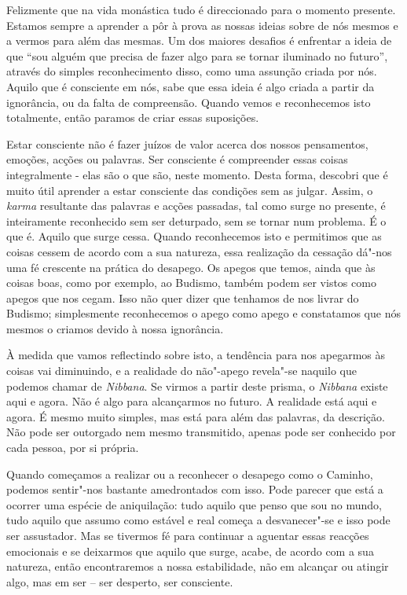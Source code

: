 Felizmente que na vida monástica tudo é direccionado para o momento
presente. Estamos sempre a aprender a pôr à prova as nossas ideias sobre
de nós mesmos e a vermos para além das mesmas. Um dos maiores desafios é
enfrentar a ideia de que ``sou alguém que precisa de fazer algo para se
tornar iluminado no futuro'', através do simples reconhecimento disso,
como uma assunção criada por nós. Aquilo que é consciente em nós, sabe
que essa ideia é algo criada a partir da ignorância, ou da falta de
compreensão. Quando vemos e reconhecemos isto totalmente, então paramos
de criar essas suposições.

Estar consciente não é fazer juízos de valor acerca dos nossos
pensamentos, emoções, acções ou palavras. Ser consciente é compreender
essas coisas integralmente - elas são o que são, neste momento. Desta
forma, descobri que é muito útil aprender a estar consciente das
condições sem as julgar. Assim, o \emph{karma} resultante das palavras e
acções passadas, tal como surge no presente, é inteiramente reconhecido
sem ser deturpado, sem se tornar num problema. É o que é. Aquilo que
surge cessa. Quando reconhecemos isto e permitimos que as coisas cessem
de acordo com a sua natureza, essa realização da cessação dá"-nos uma fé
crescente na prática do desapego. Os apegos que temos, ainda que às
coisas boas, como por exemplo, ao Budismo, também podem ser vistos como
apegos que nos cegam. Isso não quer dizer que tenhamos de nos livrar do
Budismo; simplesmente reconhecemos o apego como apego e constatamos que
nós mesmos o criamos devido à nossa ignorância.

À medida que vamos reflectindo sobre isto, a tendência para nos
apegarmos às coisas vai diminuindo, e a realidade do não"-apego revela"-se
naquilo que podemos chamar de \emph{Nibbana}. Se virmos a partir deste
prisma, o \emph{Nibbana} existe aqui e agora. Não é algo para
alcançarmos no futuro. A realidade está aqui e agora. É mesmo muito
simples, mas está para além das palavras, da descrição. Não pode ser
outorgado nem mesmo transmitido, apenas pode ser conhecido por cada
pessoa, por si própria.

Quando começamos a realizar ou a reconhecer o desapego como o Caminho,
podemos sentir"-nos bastante amedrontados com isso. Pode parecer que está
a ocorrer uma espécie de aniquilação: tudo aquilo que penso que sou no
mundo, tudo aquilo que assumo como estável e real começa a desvanecer"-se
e isso pode ser assustador. Mas se tivermos fé para continuar a aguentar
essas reacções emocionais e se deixarmos que aquilo que surge, acabe, de
acordo com a sua natureza, então encontraremos a nossa estabilidade, não
em alcançar ou atingir algo, mas em ser -- ser desperto, ser consciente.

